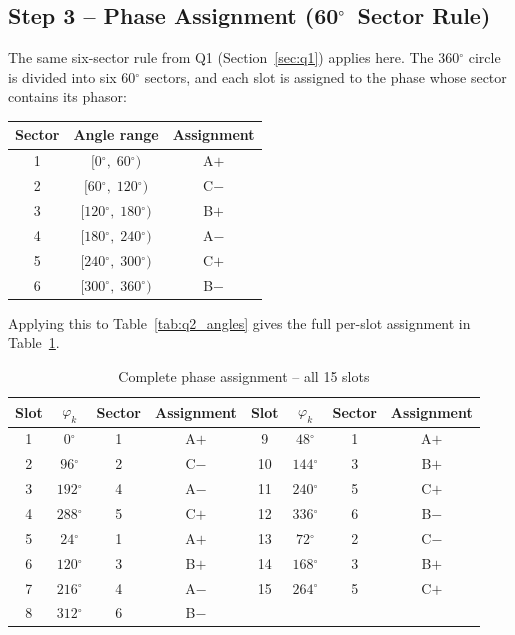 \documentclass[12pt,a4paper]{article}
\newcommand{\degree}{\ensuremath{^{\circ}}}
\begin{document}
\subsection{Step 3 -- Phase Assignment (60\degree\ Sector Rule)}

The same six-sector rule from Q1 (Section~\ref{sec:q1}) applies here.
The $360\degree$ circle is divided into six $60\degree$ sectors, and each
slot is assigned to the phase whose sector contains its phasor:

\begin{center}
\begin{tabular}{ccc}
  \toprule
  Sector & Angle range & Assignment \\
  \midrule
  1 & $[  0\degree,\; 60\degree)$ & A$+$ \\
  2 & $[ 60\degree,\;120\degree)$ & C$-$ \\
  3 & $[120\degree,\;180\degree)$ & B$+$ \\
  4 & $[180\degree,\;240\degree)$ & A$-$ \\
  5 & $[240\degree,\;300\degree)$ & C$+$ \\
  6 & $[300\degree,\;360\degree)$ & B$-$ \\
  \bottomrule
\end{tabular}
\end{center}

\noindent Applying this to Table~\ref{tab:q2_angles} gives the full
per-slot assignment in Table~\ref{tab:q2_assignment}.

\begin{table}[H]
  \centering
  \caption{Complete phase assignment -- all 15 slots}
  \label{tab:q2_assignment}
  \begin{tabular}{cccc|cccc}
    \toprule
    Slot & $\varphi_k$ & Sector & Assignment &
    Slot & $\varphi_k$ & Sector & Assignment \\
    \midrule
     1 &   $0\degree$ & 1 & A$+$ &  9 &  $48\degree$ & 1 & A$+$ \\
     2 &  $96\degree$ & 2 & C$-$ & 10 & $144\degree$ & 3 & B$+$ \\
     3 & $192\degree$ & 4 & A$-$ & 11 & $240\degree$ & 5 & C$+$ \\
     4 & $288\degree$ & 5 & C$+$ & 12 & $336\degree$ & 6 & B$-$ \\
     5 &  $24\degree$ & 1 & A$+$ & 13 &  $72\degree$ & 2 & C$-$ \\
     6 & $120\degree$ & 3 & B$+$ & 14 & $168\degree$ & 3 & B$+$ \\
     7 & $216\degree$ & 4 & A$-$ & 15 & $264\degree$ & 5 & C$+$ \\
     8 & $312\degree$ & 6 & B$-$ &    &              &   &       \\
    \bottomrule
  \end{tabular}
\end{table}
\end{document}
